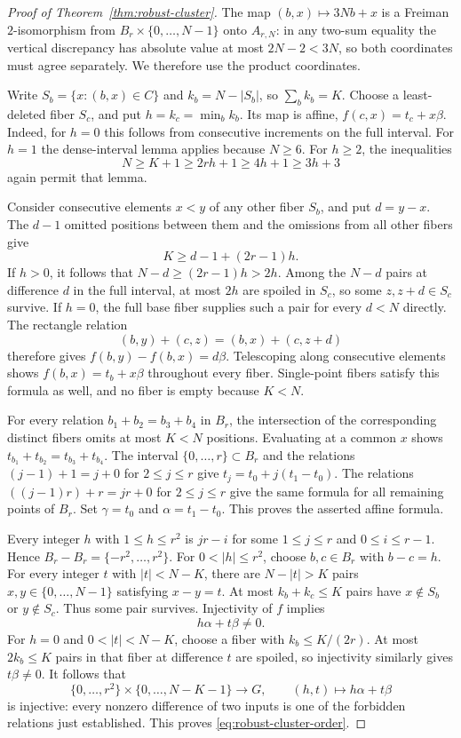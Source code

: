 \documentclass[11pt]{article}
\theoremstyle{definition}
\theoremstyle{remark}
\begin{document}
\begin{proof}[Proof of Theorem~\ref{thm:robust-cluster}]
The map $(b,x)\mapsto3Nb+x$ is a Freiman $2$-isomorphism from
$B_r\times\{0,\ldots,N-1\}$ onto $A_{r,N}$:
in any two-sum equality the vertical discrepancy has absolute value
at most $2N-2<3N$, so both coordinates must agree separately.
We therefore use the product coordinates.

Write $S_b=\{x:(b,x)\in C\}$ and $k_b=N-|S_b|$, so
$\sum_b k_b=K$. Choose a least-deleted fiber $S_c$, and put
$h=k_c=\min_b k_b$. Its map is affine,
$f(c,x)=t_c+x\beta$. Indeed, for $h=0$ this follows from consecutive
increments on the full interval. For $h=1$ the dense-interval lemma
applies because $N\ge6$. For $h\ge2$, the inequalities
\[
N\ge K+1\ge2rh+1\ge4h+1\ge3h+3
\]
again permit that lemma.

Consider consecutive elements $x<y$ of any other fiber $S_b$, and
put $d=y-x$. The $d-1$ omitted positions between them and the omissions
from all other fibers give
\[
K\ge d-1+(2r-1)h.
\]
If $h>0$, it follows that $N-d\ge(2r-1)h>2h$. Among the $N-d$
pairs at difference $d$ in the full interval, at most $2h$ are spoiled
in $S_c$, so some $z,z+d\in S_c$ survive. If $h=0$, the full base
fiber supplies such a pair for every $d<N$ directly. The rectangle
relation
\[
(b,y)+(c,z)=(b,x)+(c,z+d)
\]
therefore gives $f(b,y)-f(b,x)=d\beta$. Telescoping along consecutive
elements shows $f(b,x)=t_b+x\beta$ throughout every fiber.
Single-point fibers satisfy this formula as well, and no fiber is empty
because $K<N$.

For every relation $b_1+b_2=b_3+b_4$ in $B_r$, the intersection of
the corresponding distinct fibers omits at most $K<N$ positions.
Evaluating at a common $x$ shows
$t_{b_1}+t_{b_2}=t_{b_3}+t_{b_4}$. The interval
$\{0,\ldots,r\}\subset B_r$ and the relations
$(j-1)+1=j+0$ for $2\le j\le r$ give
$t_j=t_0+j(t_1-t_0)$. The relations
$((j-1)r)+r=jr+0$ for $2\le j\le r$ give the same formula for
all remaining points of $B_r$. Set $\gamma=t_0$ and
$\alpha=t_1-t_0$. This proves the asserted affine formula.

Every integer $h$ with $1\le h\le r^2$ is $jr-i$ for some
$1\le j\le r$ and $0\le i\le r-1$. Hence
$B_r-B_r=\{-r^2,\ldots,r^2\}$.
For $0<|h|\le r^2$, choose $b,c\in B_r$ with $b-c=h$.
For every integer $t$ with $|t|<N-K$, there are $N-|t|>K$
pairs $x,y\in\{0,\ldots,N-1\}$ satisfying $x-y=t$.
At most $k_b+k_c\le K$ pairs have $x\notin S_b$ or $y\notin S_c$.
Thus some pair survives. Injectivity of $f$ implies
\[
h\alpha+t\beta\ne0.
\]
For $h=0$ and $0<|t|<N-K$, choose a fiber with
$k_b\le K/(2r)$. At most $2k_b\le K$ pairs in that fiber at
difference $t$ are spoiled, so injectivity similarly gives
$t\beta\ne0$.
It follows that
\[
\{0,\ldots,r^2\}\times\{0,\ldots,N-K-1\}\longrightarrow G,
\qquad (h,t)\longmapsto h\alpha+t\beta
\]
is injective: every nonzero difference of two inputs is one of the
forbidden relations just established. This proves
\eqref{eq:robust-cluster-order}.


\end{proof}
\end{document}
